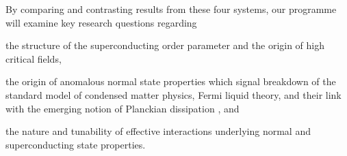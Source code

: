By comparing and contrasting results from these four systems, our  programme will examine key research questions regarding 
\begin{leftlist} 
\item 
the structure of the superconducting order parameter and the origin of high critical fields, 
\item 
the origin of anomalous normal state properties which signal breakdown of the standard model of condensed matter physics, Fermi liquid theory, and their link with the emerging notion of Planckian dissipation \cite{bruin13,hartnoll15}, and
\item 
the nature and tunability of effective interactions underlying normal and superconducting state properties.
\end{leftlist}
